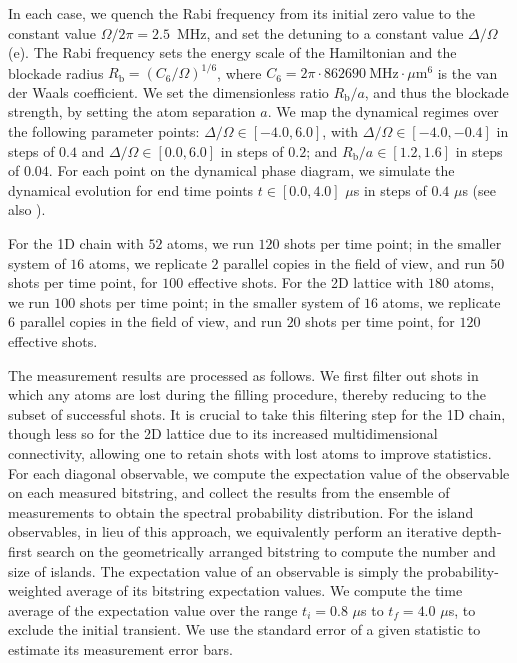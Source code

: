 \documentclass[english,floatfix,twocolumn,showpacs, aps, prx, reprint, superscriptaddress, longbibliography]{revtex4-2}
\begin{document}
In each case, we quench the Rabi frequency from its initial zero value to the constant value $\Omega / 2\pi = 2.5$~MHz, and set the detuning to a constant value $\Delta / \Omega$ (e). The Rabi frequency sets the energy scale of the Hamiltonian and the blockade radius $R_\mathrm{b} = (C_6 / \Omega)^{1/6}$, where $C_6 = 2\pi \cdot 862690~\mathrm{MHz} \cdot \mu\mathrm{m}^6$ is the van der Waals coefficient. We set the dimensionless ratio $R_\mathrm{b} / a$, and thus the blockade strength, by setting the atom separation $a$. We map the dynamical regimes over the following parameter points: $\Delta / \Omega \in [-4.0, 6.0]$, with $\Delta / \Omega \in [-4.0, -0.4]$ in steps of $0.4$ and $\Delta / \Omega \in [0.0, 6.0]$ in steps of $0.2$; and $R_\mathrm{b} / a \in [1.2, 1.6]$ in steps of $0.04$. For each point on the dynamical phase diagram, we simulate the dynamical evolution for end time points $t \in [0.0, 4.0]$ $\mu$s in steps of $0.4$ $\mu$s (see also ). 

For the 1D chain with $52$ atoms, we run $120$ shots per time point; in the smaller system of $16$ atoms, we replicate $2$ parallel copies in the field of view, and run $50$ shots per time point, for $100$ effective shots. For the 2D lattice with $180$ atoms, we run $100$ shots per time point; in the smaller system of $16$ atoms, we replicate $6$ parallel copies in the field of view, and run $20$ shots per time point, for $120$ effective shots. 

The measurement results are processed as follows. We first filter out shots in which any atoms are lost during the filling procedure, thereby reducing to the subset of successful shots. It is crucial to take this filtering step for the 1D chain, though less so for the 2D lattice due to its increased multidimensional connectivity, allowing one to retain shots with lost atoms to improve statistics. For each diagonal observable, we compute the expectation value of the observable on each measured bitstring, and collect the results from the ensemble of measurements to obtain the spectral probability distribution. For the island observables, in lieu of this approach, we equivalently perform an iterative depth-first search on the geometrically arranged bitstring to compute the number and size of islands. The expectation value of an observable is simply the probability-weighted average of its bitstring expectation values. We compute the time average of the expectation value over the range $t_i = 0.8$ $\mu$s to $t_f = 4.0$ $\mu$s, to exclude the initial transient. We use the standard error of a given statistic to estimate its measurement error bars. 
\end{document}
